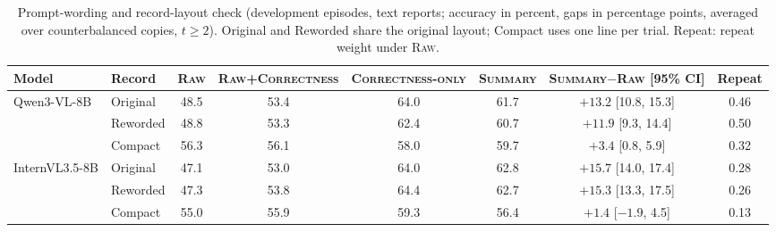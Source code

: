 \documentclass[letterpaper]{article} %
\newcommand{\Raw}{\textsc{Raw}}
\newcommand{\RawCorrectness}{\textsc{Raw+Correctness}}
\newcommand{\CorrectnessOnly}{\textsc{Correctness-only}}
\newcommand{\Summary}{\textsc{Summary}}
\begin{document}
\begin{table}[!t]\centering\small
  \setlength{\tabcolsep}{5pt}
  \begin{tabular}{ll cccc c c}
    \toprule
    Model & Record & \Raw{} & \RawCorrectness{} & \CorrectnessOnly{} & \Summary{} & \Summary{}$-$\Raw{} [95\% CI] & Repeat \\
    \midrule
    Qwen3-VL-8B & Original & 48.5 & 53.4 & 64.0 & 61.7 & $+13.2$ [10.8, 15.3] & 0.46 \\
    & Reworded & 48.8 & 53.3 & 62.4 & 60.7 & $+11.9$ [9.3, 14.4] & 0.50 \\
    & Compact & 56.3 & 56.1 & 58.0 & 59.7 & $+3.4$ [0.8, 5.9] & 0.32 \\
    \midrule
    InternVL3.5-8B & Original & 47.1 & 53.0 & 64.0 & 62.8 & $+15.7$ [14.0, 17.4] & 0.28 \\
    & Reworded & 47.3 & 53.8 & 64.4 & 62.7 & $+15.3$ [13.3, 17.5] & 0.26 \\
    & Compact & 55.0 & 55.9 & 59.3 & 56.4 & $+1.4$ [$-1.9$, 4.5] & 0.13 \\
    \bottomrule
  \end{tabular}
  \caption{Prompt-wording and record-layout check (development episodes, text reports; accuracy in percent, gaps in percentage points, averaged over counterbalanced copies, $t\ge 2$). Original and Reworded share the original layout; Compact uses one line per trial. Repeat: repeat weight under \Raw{}.}
  \label{tab:wording}
\end{table}
\end{document}
